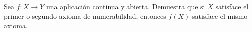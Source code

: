  \item Sea $f: X \to Y$ una aplicación continua y abierta. Demuestra que si $X$ satisface el primer o segundo axioma de numerabilidad, entonces $f(X)$ satisface el mismo axioma.

  
